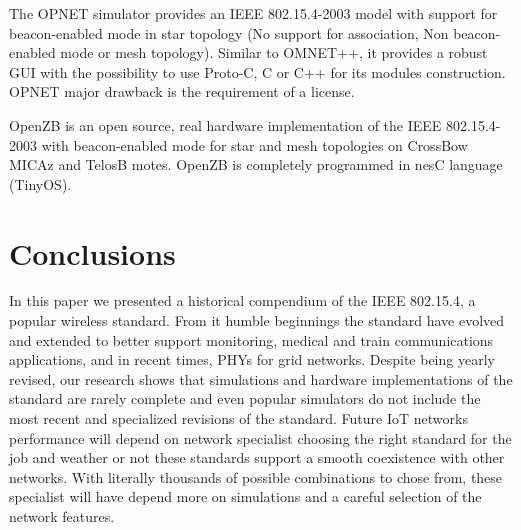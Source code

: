 \documentclass[conference]{IEEEtran}
\begin{document}
The OPNET simulator provides an IEEE 802.15.4-2003 model \cite{opnet} with support for beacon-enabled mode in star topology (No support for association, Non beacon-enabled mode or mesh topology). Similar to OMNET++, it provides a robust GUI with the possibility to use Proto-C, C or C++ for its modules construction. OPNET major drawback is the requirement of a license.

OpenZB \cite{openzb} is an open source, real hardware implementation of the IEEE 802.15.4-2003 with beacon-enabled mode for star and mesh topologies on CrossBow MICAz and TelosB motes. OpenZB is completely programmed in nesC language (TinyOS).


\section{Conclusions} \label{conclusions}
In this paper we presented a historical compendium of the IEEE 802.15.4, a popular wireless standard. From it humble beginnings the standard have evolved and extended to better support monitoring, medical and train communications applications, and in recent times, PHYs for grid networks. Despite being yearly revised, our research shows that simulations and hardware implementations of the standard are rarely complete and even popular simulators do not include the most recent and specialized revisions of the standard. Future IoT networks performance will depend on network specialist choosing the right standard for the job and weather or not these standards support a smooth coexistence with other networks. With literally thousands of possible combinations to chose from, these specialist will have depend more on simulations and a careful selection of the network features.  
 

 

 



\end{document}
